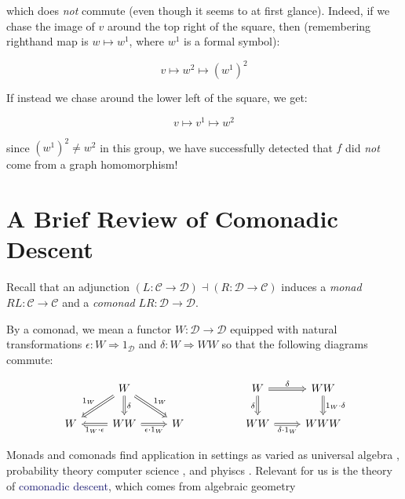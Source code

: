 \documentclass[12pt]{article}
\theoremstyle{definition}
\theoremstyle{theorem}
\newcommand*{\catVarFont}[1]{\mathcal{#1}}
\newcommand{\catC}{\catVarFont{C}}
\newcommand{\catD}{\catVarFont{D}}
\newcommand*{\important}[1]{\textcolor{MidnightBlue}{#1}}
\begin{document}
which does \emph{not} commute (even though it seems to at first glance). 
Indeed, if we chase the image of $v$ around the top right of the square, then
(remembering righthand map is $w \mapsto w^1$, where $w^1$ is a formal symbol):

\[ v \mapsto w^2 \mapsto (w^1)^2 \]

If instead we chase around the lower left of the square, we get:

\[ v \mapsto v^1 \mapsto w^2 \]

since $(w^1)^2 \neq w^2$ in this group, we have successfully detected that 
$f$ did \emph{not} come from a graph homomorphism!

\section{A Brief Review of Comonadic Descent}
\label{review}


Recall that an adjunction
$(L : \catC \to \catD) \dashv (R : \catD \to \catC)$
induces a \emph{monad} $RL : \catC \to \catC$ and a \emph{comonad}
$LR : \catD \to \catD$.

By a comonad, we mean a functor $W : \catD \to \catD$ equipped with natural
transformations $\epsilon : W \Rightarrow 1_\catD$ and $\delta : W \Rightarrow WW$
so that the following diagrams commute:

\[
    \begin{tikzcd}
    & W &&& W & WW \\
    W & WW & W && WW & WWW
    \arrow["{1_W \cdot \epsilon}", Rightarrow, from=2-2, to=2-1]
    \arrow["{\epsilon \cdot 1_W}"', Rightarrow, from=2-2, to=2-3]
    \arrow["\delta", Rightarrow, from=1-2, to=2-2]
    \arrow["{1_W}"', Rightarrow, from=1-2, to=2-1]
    \arrow["{1_W}", Rightarrow, from=1-2, to=2-3]
    \arrow["\delta"', Rightarrow, from=1-5, to=2-5]
    \arrow["\delta", Rightarrow, from=1-5, to=1-6]
    \arrow["{\delta \cdot 1_W}"', Rightarrow, from=2-5, to=2-6]
    \arrow["{1_W \cdot \delta}", Rightarrow, from=1-6, to=2-6]
    \end{tikzcd}
\]

Monads and comonads find application in settings as varied as universal algebra 
, probability theory 
computer science ,
and phyiscs .
Relevant for us is the theory of \important{comonadic descent}, 
which comes from algebraic geometry 
\end{document}
